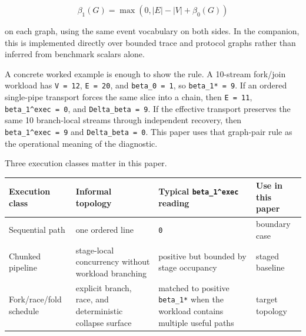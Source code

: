 \documentclass[
  11pt,
]{article}
\newcounter{none} %
\begin{document}
\[
\beta_1(G) = \max(0, |E| - |V| + \beta_0(G))
\]

on each graph, using the same event vocabulary on both sides. In the
companion, this is implemented directly over bounded trace and protocol
graphs rather than inferred from benchmark scalars alone.

A concrete worked example is enough to show the rule. A 10-stream
fork/join workload has \texttt{\textbar{}V\textbar{}\ =\ 12},
\texttt{\textbar{}E\textbar{}\ =\ 20}, and \texttt{beta\_0\ =\ 1}, so
\texttt{beta\_1*\ =\ 9}. If an ordered single-pipe transport forces the
same slice into a chain, then \texttt{\textbar{}E\textbar{}\ =\ 11},
\texttt{beta\_1\^{}exec\ =\ 0}, and \texttt{Delta\_beta\ =\ 9}. If the
effective transport preserves the same 10 branch-local streams through
independent recovery, then \texttt{beta\_1\^{}exec\ =\ 9} and
\texttt{Delta\_beta\ =\ 0}. This paper uses that graph-pair rule as the
operational meaning of the diagnostic.

Three execution classes matter in this paper.

{\def\LTcaptype{none} %
\begin{longtable}[]{@{}
  >{\raggedright\arraybackslash}p{}
  >{\raggedright\arraybackslash}p{}
  >{\raggedleft\arraybackslash}p{}
  >{\raggedright\arraybackslash}p{}@{}}
\toprule\noalign{}
\begin{minipage}[b]{\linewidth}\raggedright
Execution class
\end{minipage} & \begin{minipage}[b]{\linewidth}\raggedright
Informal topology
\end{minipage} & \begin{minipage}[b]{\linewidth}\raggedleft
Typical \texttt{beta\_1\^{}exec} reading
\end{minipage} & \begin{minipage}[b]{\linewidth}\raggedright
Use in this paper
\end{minipage} \\
\midrule\noalign{}
\endhead
\bottomrule\noalign{}
\endlastfoot
Sequential path & one ordered line & \texttt{0} & boundary case \\
Chunked pipeline & stage-local concurrency without workload branching &
positive but bounded by stage occupancy & staged baseline \\
Fork/race/fold schedule & explicit branch, race, and deterministic
collapse surface & matched to positive \texttt{beta\_1*} when the
workload contains multiple useful paths & target topology \\
\end{longtable}
}
\end{document}
